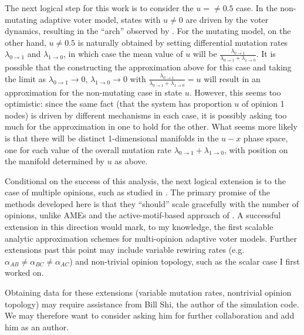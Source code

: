 \documentclass[english]{scrartcl}
\begin{document}
	The next logical step for this work is to consider the $u = \neq 0.5$ case. In the non-mutating adaptive voter model, states with $u \neq 0$ are driven by the voter dynamics, resulting in the ``arch'' observed by \cite{Durrett2012}. For the mutating model, on the other hand, $u \neq 0.5$ is naturally obtained by setting differential mutation rates $\lambda_{0\rightarrow 1}$ and $\lambda_{1\rightarrow 0}$, in which case the mean value of $u$ will be $\frac{\lambda_{0\rightarrow1}}{\lambda_{0\rightarrow 1} + \lambda_{1 \rightarrow 0}}$. It is possible that the constructing the approximation above for this case and taking the limit as $\lambda_{0\rightarrow 1} \rightarrow 0$, $\lambda_{1\rightarrow 0} \rightarrow 0$ with $\frac{\lambda_{0\rightarrow1}}{\lambda_{0\rightarrow 1} + \lambda_{1 \rightarrow 0}} = u$ will result in an approximation for the non-mutating case in state $u$. However, this seems too optimistic: since the same fact (that the system has proportion $u$ of opinion 1 nodes) is driven by different mechanisms in each case, it is possibly asking too much for the approximation in one to hold for the other. What seems more likely is that there will be distinct 1-dimensional manifolds in the $u-x$ phase space, one for each value of the overall mutation rate $\lambda_{0\rightarrow 1} + \lambda_{1\rightarrow 0}$, with position on the manifold determined by $u$ as above. 

	Conditional on the success of this analysis, the next logical extension is to the case of multiple opinions, such as studied in \cite{Shi2013}. The primary promise of the methods developed here is that they ``should'' scale gracefully with the number of opinions, unlike AMEs and the active-motif-based approach of \cite{Demirel2012}. A successful extension in this direction would mark, to my knowledge, the first scalable analytic approximation schemes for multi-opinion adaptive voter models. Further extensions past this point may include variable rewiring rates (e.g. $\alpha_{AB} \neq \alpha_{BC} \neq \alpha_{AC}$) and non-trivial opinion topology, such as the scalar case I first worked on.  

	Obtaining data for these extensions (variable mutation rates, nontrivial opinion topology) may require assistance from Bill Shi, the author of the simulation code. We may therefore want to consider asking him for further collaboration and add him as an author. 








		





{}

\end{document}
